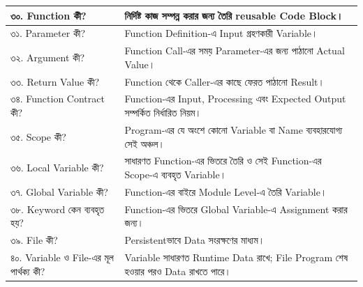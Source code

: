 \begin{longtable}{
|L{0.33\textwidth}
|L{0.59\textwidth}|
}
৩০. Function কী?
&
নির্দিষ্ট কাজ সম্পন্ন করার জন্য তৈরি reusable Code Block।
\\
\hline

৩১. Parameter কী?
&
Function Definition-এ Input গ্রহণকারী Variable।
\\
\hline

৩২. Argument কী?
&
Function Call-এর সময় Parameter-এর জন্য পাঠানো Actual Value।
\\
\hline

৩৩. Return Value কী?
&
Function থেকে Caller-এর কাছে ফেরত পাঠানো Result।
\\
\hline

৩৪. Function Contract কী?
&
Function-এর Input, Processing এবং Expected Output সম্পর্কিত নির্ধারিত নিয়ম।
\\
\hline

৩৫. Scope কী?
&
Program-এর যে অংশে কোনো Variable বা Name ব্যবহারযোগ্য সেই অঞ্চল।
\\
\hline

৩৬. Local Variable কী?
&
সাধারণত Function-এর ভিতরে তৈরি ও সেই Function-এর Scope-এ ব্যবহৃত Variable।
\\
\hline

৩৭. Global Variable কী?
&
Function-এর বাইরে Module Level-এ তৈরি Variable।
\\
\hline

৩৮.  Keyword কেন ব্যবহৃত হয়?
&
Function-এর ভিতরে Global Variable-এ Assignment করার জন্য।
\\
\hline

৩৯. File কী?
&
Persistentভাবে Data সংরক্ষণের মাধ্যম।
\\
\hline

৪০. Variable ও File-এর মূল পার্থক্য কী?
&
Variable সাধারণত Runtime Data রাখে; File Program শেষ হওয়ার পরও Data রাখতে পারে।
\\
\hline

\end{longtable}


